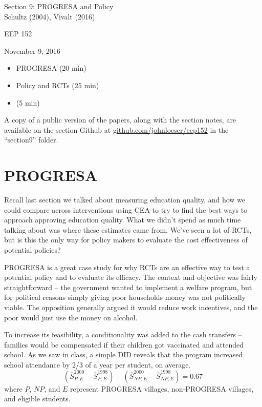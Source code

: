 \documentclass[12pt,english]{article}
\begin{document}
\begin{center}
{\Large{}Section 9: PROGRESA and Policy} \\
{\large{}Schultz (2004), Vivalt (2016)}
\par\end{center}{\Large \par}

\begin{center}
EEP 152
\par\end{center}

\begin{center}
November 9, 2016
\par\end{center}

\begin{itemize}
	\setlength\itemsep{-0.5em}
	\item PROGRESA (20 min)
	\item Policy and RCTs (25 min)
	\item (5 min)
\end{itemize}
A copy of a public version of the papers, along with the section notes, are available on the section Github at \href{github.com/johnloeser/eep152}{github.com/johnloeser/eep152} in the ``section9'' folder.

\section{PROGRESA}

Recall last section we talked about measuring education quality, and how we could compare across interventions using CEA to try to find the best ways to approach approving education quality. What we didn't spend as much time talking about was where these estimates came from. We've seen a lot of RCTs, but is this the only way for policy makers to evaluate the cost effectiveness of potential policies?

PROGRESA is a great case study for why RCTs are an effective way to test a potential policy and to evaluate its efficacy. The context and objective was fairly straightforward -- the government wanted to implement a welfare program, but for political reasons simply giving poor households money was not politically viable. The opposition generally argued it would reduce work incentives, and the poor would just use the money on alcohol.

To increase its feasibility, a conditionality was added to the cash transfers -- families would be compensated if their children got vaccinated and attended school. As we saw in class, a simple DID reveals that the program increased school attendance by 2/3 of a year per student, on average.
$$ \left( \overline{S}^{2000}_{P,E} - \overline{S}^{1998}_{P,E} \right) - \left( \overline{S}^{2000}_{NP,E} - \overline{S}^{1998}_{NP,E} \right) = 0.67 $$
where $P$, $NP$, and $E$ represent PROGRESA villages, non-PROGRESA villages, and eligible students.
\end{document}
